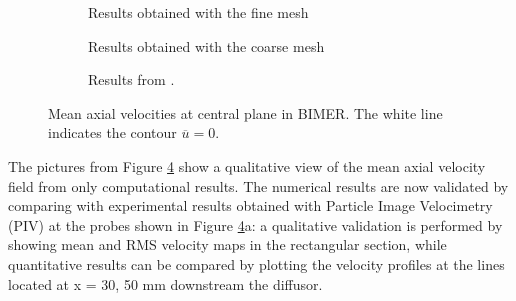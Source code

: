 \begin{figure}[ht]
\centering
\begin{subfigure}[b]{0.4\textwidth}
	\centering
   \caption{Results obtained with the fine mesh}
   \label{fig:field_axial_velocity_mean_fine}
\end{subfigure}
\hspace{0.8in}
\begin{subfigure}[b]{0.4\textwidth}
	\centering
   \caption{Results obtained with the coarse mesh}
   \label{fig:field_axial_velocity_mean_coarse}
\end{subfigure}
\begin{subfigure}[b]{1.0\textwidth}
	\centering
   \caption{Results from .}
   \label{fig:field_axial_velocity_mean_cheneau} 
\end{subfigure}
\caption[Mean axial velocities at central plane in BIMER]{Mean axial velocities at central plane in BIMER. The white line indicates the contour $\overline{u} = 0$.}
\label{fig:BIMER_mean_axial_velocities}
\end{figure}


\clearpage
 
The pictures from Figure \ref{fig:BIMER_mean_axial_velocities} show a qualitative view of the mean axial velocity field from only computational results. The numerical results are now validated by comparing with experimental results obtained with Particle Image Velocimetry (PIV) at the probes shown in Figure \ref{fig:BIMER_mean_axial_velocities}a: a qualitative validation is performed by showing mean and RMS velocity maps in the rectangular section, while quantitative results can be compared by plotting the velocity profiles at the lines located at x = 30, 50 mm downstream the diffusor.



